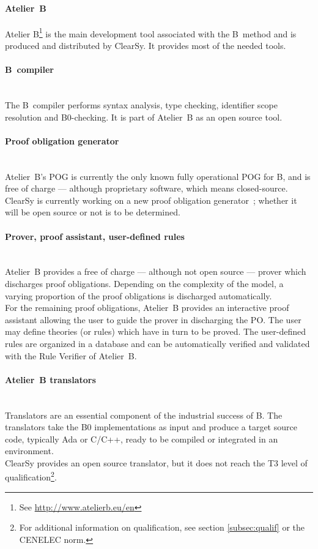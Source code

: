 \paragraph{Atelier~B}
\label{subsec:atelierb}
Atelier B\footnote{See \url{http://www.atelierb.eu/en}} is the main development tool associated with the B~method and is produced and distributed by ClearSy. It provides most of the needed tools.

\paragraph{B~compiler}~\\
The B~compiler performs syntax analysis, type checking, identifier scope resolution and B0-checking. It is part of Atelier~B as an open source tool.

\paragraph{Proof obligation generator}~\\
Atelier~B's POG is currently the only known fully operational POG for B, and is free of charge --- although proprietary software, which means closed-source. ClearSy is currently working on a new proof obligation generator~; whether it will be open source or not is to be determined.

\paragraph{Prover, proof assistant, user-defined rules}~\\
Atelier~B provides a free of charge --- although not open source --- prover which discharges proof obligations. Depending on the complexity of the model, a varying proportion of the proof obligations is discharged automatically.\\
For the remaining proof obligations, Atelier~B provides an interactive proof assistant allowing the user to guide the prover in discharging the PO. The user may define theories (or rules) which have in turn to be proved. The user-defined rules are organized in a database and can be automatically verified and validated with the Rule Verifier of Atelier~B.

\paragraph{Atelier~B translators}~\\
Translators are an essential component of the industrial success of B. The translators take the B0 implementations as input and produce a target source code, typically Ada or C/C++, ready to be compiled or integrated in an environment.\\
ClearSy provides an open source translator, but it does not reach the T3 level of qualification\footnote{For additional information on qualification, see section \ref{subsec:qualif} or the CENELEC norm.}.

